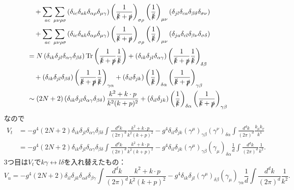 \begin{align*}
  & \quad + \sum_{ac} \sum_{\mu\nu\rho\sigma}
  \left( \delta_{ic} \delta_{ak} \delta_{\alpha\rho} \delta_{\mu\gamma} \right)
  \left( \frac{1}{\slashed{k} + \slashed{p}} \right)_{\sigma\rho}
  \left( \frac{1}{\slashed{k}} \right)_{\mu\nu}
  \left( \delta_{jl} \delta_{ca} \delta_{\beta\delta} \delta_{\sigma\nu} \right) \\
  & \quad + \sum_{ac} \sum_{\mu\nu\rho\sigma}
  \left( \delta_{ic} \delta_{ak} \delta_{\alpha\rho} \delta_{\mu\gamma} \right)
  \left( \frac{1}{\slashed{k} + \slashed{p}} \right)_{\sigma\rho}
  \left( \frac{1}{\slashed{k}} \right)_{\mu\nu}
  \left( \delta_{ja} \delta_{cl} \delta_{\beta\nu} \delta_{\sigma\delta} \right) \\
  &= N \left( \delta_{ik} \delta_{jl} \delta_{\alpha\gamma} \delta_{\beta\delta} \right) \operatorname{Tr} \left( \frac{1}{\slashed{k} + \slashed{p}} \frac{1}{\slashed{k}} \right)
  + \left( \delta_{ik} \delta_{jl} \delta_{\alpha\gamma} \right) \left( \frac{1}{\slashed{k} + \slashed{p}} \frac{1}{\slashed{k}} \right)_{\delta\beta} \\
  & \quad + \left( \delta_{ik} \delta_{jl} \delta_{\beta\delta} \right) \left( \frac{1}{\slashed{k} + \slashed{p}} \frac{1}{\slashed{k}} \right)_{\gamma\alpha}
  + \left( \delta_{il} \delta_{jk} \right) \left( \frac{1}{\slashed{k}} \right)_{\delta\alpha} \left( \frac{1}{\slashed{k} + \slashed{p}} \right)_{\gamma\beta} \\
  &\sim (2N+2) \left( \delta_{ik} \delta_{jl} \delta_{\alpha\gamma} \delta_{\beta\delta} \right) \frac{k^2 + k \cdot p}{k^2(k+p)^2}
  + \left( \delta_{il} \delta_{jk} \right) \left( \frac{1}{\slashed{k}} \right)_{\delta\alpha} \left( \frac{1}{\slashed{k} + \slashed{p}} \right)_{\gamma\beta}
\end{align*}
なので
\begin{align*}
  V_t &= - g^4 (2N+2) \delta_{ik} \delta_{jl} \delta_{\alpha\gamma} \delta_{\beta\delta} \int \frac{d^dk}{(2\pi)^d} \frac{k^2 + k \cdot p}{k^2(k+p)^2}
  - g^4 \delta_{il} \delta_{jk} (\gamma^\mu)_{\gamma\beta}(\gamma^\nu)_{\delta\alpha} \int \frac{d^dk}{(2\pi)^d} \frac{k_\mu k_\nu}{k^4} \\
  &= - g^4 (2N+2) \delta_{ik} \delta_{jl} \delta_{\alpha\gamma} \delta_{\beta\delta} \int \frac{d^dk}{(2\pi)^d} \frac{k^2 + k \cdot p}{k^2(k+p)^2}
  - g^4 \delta_{il} \delta_{jk} (\gamma^\mu)_{\gamma\beta}(\gamma_\mu)_{\delta\alpha} \frac{1}{d} \int \frac{d^dk}{(2\pi)^d} \frac{1}{k^2} .
\end{align*}
3つ目は$V_t$で$k\gamma \leftrightarrow l\delta$を入れ替えたもの：
\[ V_u = - g^4 (2N+2) \delta_{il} \delta_{jk} \delta_{\alpha\delta} \delta_{\beta\gamma} \int \frac{d^dk}{(2\pi)^d} \frac{k^2 + k \cdot p}{k^2(k+p)^2}
- g^4 \delta_{ik} \delta_{jl} (\gamma^\mu)_{\delta\beta}(\gamma_\mu)_{\gamma\alpha} \frac{1}{d} \int \frac{d^dk}{(2\pi)^d} \frac{1}{k^2} . \]

